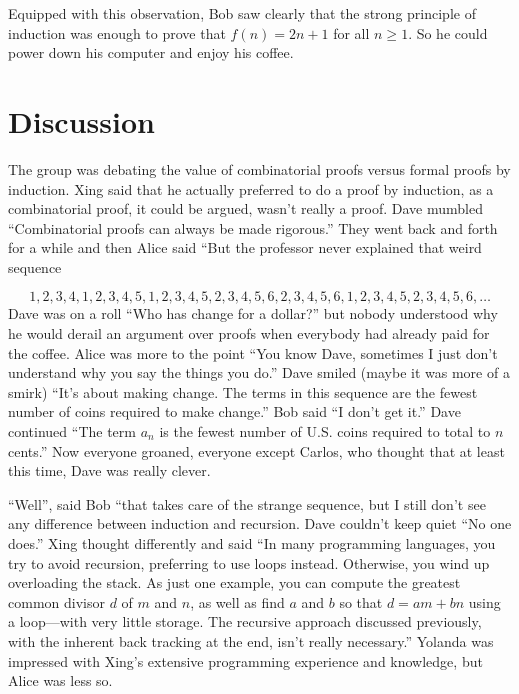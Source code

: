 Equipped with this observation, Bob saw clearly that the strong principle
of induction was enough to prove that $f(n)=2n+1$ for all $n\ge1$.
So he could power down his computer and enjoy his coffee.

\section{Discussion}
 
The group was debating the value of combinatorial proofs versus
formal proofs by induction.  Xing said that he actually preferred to
do a proof by induction, as a combinatorial proof, it could be
argued, wasn't really a proof.  Dave mumbled ``Combinatorial proofs
can always be made rigorous.''   They went back and forth for a
while and then Alice said ``But the professor never explained
that weird sequence

\[
1,2,3,4,1,2,3,4,5,1,2,3,4,5,2,3,4,5,6,2,3,4,5,6,1,2,3,4,5,2,3,4,5,6,\dots
\]
Dave was on a roll ``Who has change for a dollar?'' but nobody
understood why he would derail an argument over proofs when
everybody had already paid for the coffee.  Alice was more to the
point ``You know Dave, sometimes I just don't understand why
you say  the things you do.''  Dave smiled (maybe it was more of
a smirk) ``It's about making change.  The terms in this sequence
are the fewest number of coins required to make change.''
Bob said ``I don't get it.'' Dave continued ``The term  $a_n$ is
the fewest number of U.S. coins required to total to $n$ cents.''
Now everyone groaned, everyone except Carlos, who thought that
at least this time, Dave was really clever.

``Well'', said Bob ``that takes care of the strange sequence,
but I still don't see any difference between
induction and recursion.  Dave couldn't keep quiet ``No one does.''  Xing thought
differently and said ``In many programming languages, you try to
avoid recursion, preferring to use loops instead.  Otherwise, you
wind up overloading the stack.  As just one example, you can
compute the greatest common divisor $d$ of $m$ and $n$, as well as
find $a$ and $b$ so that $d=am+bn$ using a loop---with very
little storage.  The recursive approach discussed previously, with 
the inherent back tracking at the end, isn't really necessary.''  
Yolanda was impressed with Xing's extensive programming experience and 
knowledge, but Alice was less so.  

